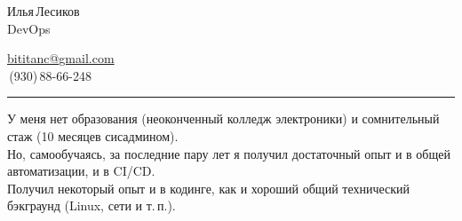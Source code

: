 \documentclass[10pt, a4paper]{article}
\begin{document}


{\setlength\multicolsep{0pt}%
\begin{multicols}{2}





\begin{spacing}{1.5}
  {\LARGE Илья\,Лесиков}\\
  {\large DevOps}\hspace{1.3cm}{\large 25\,лет}
\end{spacing}

\columnbreak

\begin{flushright}
  \begin{spacing}{1.3}
    {\large \href{mailto:bititanc@gmail.com}{bititanc@gmail.com}}\\
    \fontsize{1.4em}{0}\,(930)\,88-66-248 \normalsize\\
  \end{spacing}
\end{flushright}

\end{multicols}
}

\vspace{-10pt}
\textcolor[RGB]{220,220,220}{\rule{\linewidth}{0.2pt}}
\vspace{5pt}

У меня нет образования (неоконченный колледж электроники) и сомнительный стаж (10 месяцев сисадмином).\\
Но, самообучаясь, за последние пару лет я получил достаточный опыт и в общей автоматизации, и в CI/CD.\\
Получил некоторый опыт и в кодинге, как и хороший общий технический бэкграунд (Linux, сети и т.\,п.).
\end{document}
